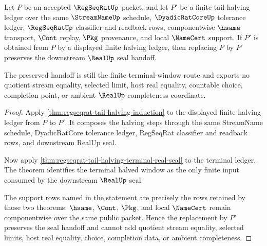 \begin{theorem}
\label{thm:regseqrat-tail-halving-stability}
Let $P$ be an accepted $\RegSeqRatUp$ packet, and let $P'$ be a finite tail-halving ledger over the same $\StreamNameUp$ schedule, $\DyadicRatCoreUp$ tolerance ledger, $\RegSeqRatUp$ classifier and readback rows, componentwise $\hsame$ transport, $\Cont$ replay, $\Pkg$ provenance, and local $\NameCert$ support. If $P'$ is obtained from $P$ by a displayed finite halving ledger, then replacing $P$ by $P'$ preserves the downstream $\RealUp$ seal handoff.

The preserved handoff is still the finite terminal-window route and exports no quotient stream equality, selected limit, host real equality, countable choice, completion point, or ambient $\RealUp$ completeness coordinate.
\end{theorem}
\begin{proof}
Apply \autoref{thm:regseqrat-tail-halving-induction} to the displayed finite halving ledger from $P$ to $P'$. It composes the halving steps through the same StreamName schedule, DyadicRatCore tolerance ledger, RegSeqRat classifier and readback rows, and downstream RealUp seal.

Now apply \autoref{thm:regseqrat-tail-halving-terminal-real-seal} to the terminal ledger. The theorem identifies the terminal halved window as the only finite input consumed by the downstream $\RealUp$ seal.

The support rows named in the statement are precisely the rows retained by those two theorems: $\hsame$, $\Cont$, $\Pkg$, and local $\NameCert$ remain componentwise over the same public packet. Hence the replacement by $P'$ preserves the seal handoff and cannot add quotient stream equality, selected limits, host real equality, choice, completion data, or ambient completeness.
\end{proof}
